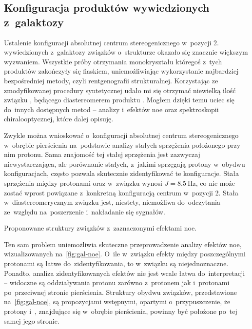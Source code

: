 \subsection{Konfiguracja produktów wywiedzionych z~galaktozy}
Ustalenie konfiguracji absolutnej centrum stereogenicznego w~pozycji 2. wywiedzionych
  z~galaktozy związków o~strukturze  okazało się znacznie większym wyzwaniem.
Wszystkie próby otrzymania monokryształu któregoś z~tych produktów zakończyły się fiaskiem,
  uniemożliwiając wykorzystanie najbardziej bezpośredniej metody,
  czyli rentgenografii strukturalnej.
Korzystając ze zmodyfikowanej procedury syntetycznej udało mi się otrzymać niewielką ilość związku ,
  będącego diastereomerem produktu .
Mogłem dzięki temu uciec się do~innych dostępnych metod \--- analizy \NMR*{} i~efektów \gls{noe}
  oraz spektroskopii chiralooptycznej, które dalej opisuję.

Zwykle można wnioskować o~konfiguracji absolutnej centrum stereogenicznego w~obrębie pierścienia
  na~podstawie analizy stałych sprzężenia położonego przy nim protonu.
Sama znajomość tej stałej sprzężenia jest zazwyczaj niewystarczająca, ale porównanie stałych,
  z~jakimi sprzęgają protony w~obydwu konfiguracjach, często pozwala skutecznie zidentyfikować
  te konfiguracje.
Stała sprzężenia między protonami  oraz  w~związku  wynosi
  $J = \SI{8.5}{\hertz}$, co nie może zostać wprost powiązane z~konkretną konfiguracją
  centrum w~pozycji 2.
Stała w~diastereomerycznym związku  jest, niestety,
  niemożliwa do~odczytania ze~względu na~poszerzenie i~nakładanie się sygnałów.

\begin{marginfigure}
  
  \caption{
    Proponowane struktury związków  z~zaznaczonymi
      efektami \gls{noe}.
  }\label{fig:gal-noe}
\end{marginfigure}

Ten sam problem uniemożliwia skuteczne przeprowadzenie analizy efektów \gls{noe},
  wizualizowanych na~\cref{fig:gal-noe}.
O~ile w~związku  efekty między poszczególnymi protonami są łatwe
  do~zidentyfikowania, to w~związku  są niejednoznaczne.
Ponadto, analiza zidentyfikowanych efektów nie jest wcale łatwa do~interpretacji \---
  widoczne są oddziaływania protonu  zarówno z~protonem  jak i~protonami
   po~przeciwnej stronie pierścienia.
Struktury obydwu związków, przedstawione na~\cref{fig:gal-noe}, są propozycjami wstępnymi,
  opartymi o~przypuszczenie, że protony  i~, znajdujące się w~obrębie
  pierścienia, powinny być położone po~tej samej jego stronie.

